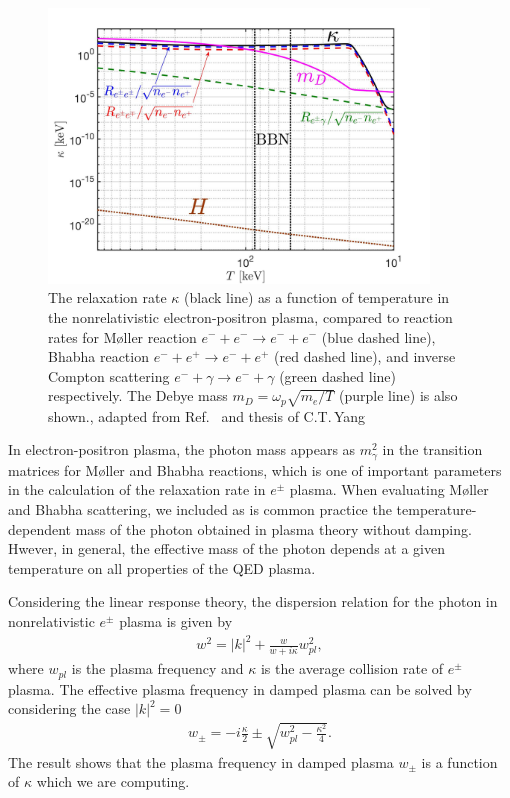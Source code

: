 \begin{figure} 
\centerline{\includegraphics[width=0.9\textwidth]{./plots/May152023Kappa_EPPlasma}}
\caption{The relaxation rate $\kappa$ (black line) as a function of temperature in the nonrelativistic electron-positron plasma, compared to reaction rates  for M{\o}ller reaction $e^-+e^-\to e^-+e^-$ (blue dashed line), Bhabha reaction $e^-+e^+\to e^-+e^+$ (red dashed line), and inverse Compton scattering $e^-+\gamma\to e^-+\gamma$ (green dashed line) respectively. The Debye mass $m_D=\omega_{p}\sqrt{m_e/T}$ (purple line) is also shown., adapted from Ref.~\cite{Grayson:2023flr} and thesis of C.T.\,Yang~\cite{Yang:2024ret}}
\label{RelaxationRate:fig}
\end{figure}


In electron-positron plasma, the photon mass appears as $m_\gamma^2$ in the transition matrices for M{\o}ller and Bhabha reactions, which is one of important parameters in the calculation of the relaxation rate in $e^\pm$ plasma. When evaluating M{\o}ller and Bhabha scattering, we included as is common practice the temperature-dependent mass of the photon obtained in plasma theory without damping. Hwever, in general, the effective mass of the photon depends at a given temperature on all properties of the QED plasma. 

Considering the linear response theory, the dispersion relation for the photon in nonrelativistic $e^\pm$ plasma is given by~\cite{Formanek:2021blc}
\begin{align}\label{dispersion_damping}
w^2=|k|^2+\frac{w}{w+i\kappa}w_{pl}^2,
\end{align}
where $w_{pl}$ is the plasma frequency and $\kappa$ is the average collision rate of $e^\pm$ plasma. The effective plasma frequency in damped plasma can be solved by considering the case $|k|^2=0$~\cite{Formanek:2021blc}
\begin{align}\label{plasmafrequency_damped}
w_{\pm}=-i\frac{\kappa}{2}\pm\sqrt{w^2_{pl}-\frac{\kappa^2}{4}}.
\end{align}
The result shows that the plasma frequency in damped plasma $w_\pm$ is a function of $\kappa$ which we are computing.  

